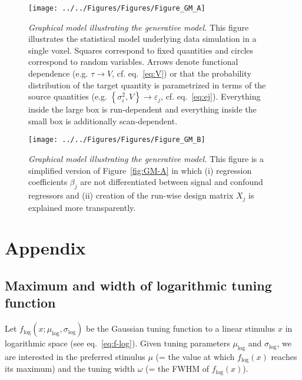 \documentclass[a4paper,12pt]{article}
\begin{document}
\begin{figure}
	\begin{center}
		\texttt{[image: ../../Figures/Figures/Figure\_GM\_A]}
	\end{center}
	\vspace{-1em}
	\caption{\textit{Graphical model illustrating the generative model.} This figure illustrates the statistical model underlying data simulation in a single voxel. Squares correspond to fixed quantities and circles correspond to random variables. Arrows denote functional dependence (e.g. $\tau \rightarrow V$, cf. eq.~\ref{eq:V}) or that the probability distribution of the target quantity is parametrized in terms of the source quantities (e.g. $\left\lbrace \sigma_i^2, V \right\rbrace \rightarrow \varepsilon_j$, cf. eq.~\ref{eq:ej}). Everything inside the large box is run-dependent and everything inside the small box is additionally scan-dependent.} \label{fig:GM-A}
	\begin{center}
		\texttt{[image: ../../Figures/Figures/Figure\_GM\_B]}
	\end{center}
	\vspace{-1em}
	\caption{\textit{Graphical model illustrating the generative model.} This figure is a simplified version of Figure~\ref{fig:GM-A} in which (i) regression coefficients $\beta_j$ are not differentiated between signal and confound regressors and (ii) creation of the run-wise design matrix $X_j$ is explained more transparently.} \label{fig:GM-B}
\end{figure}



\pagebreak
\section{Appendix} \label{sec:Appendix}
\renewcommand\thesubsection{\Alph{subsection}}
\renewcommand\theequation{\thesubsection.\arabic{equation}}

\setcounter{equation}{0}
\subsection{Maximum and width of logarithmic tuning function} \label{sec:App-A}

Let $f_\mathrm{log}(x; \mu_\mathrm{log}, \sigma_\mathrm{log})$ be the Gaussian tuning function to a linear stimulus $x$ in logarithmic space (see eq.~\ref{eq:f-log}). Given tuning parameters $\mu_\mathrm{log}$ and $\sigma_\mathrm{log}$, we are interested in the preferred stimulus $\mu$ (= the value at which $f_\mathrm{log}(x)$ reaches its maximum) and the tuning width $\omega$ (= the FWHM of  $f_\mathrm{log}(x)$).
\end{document}
